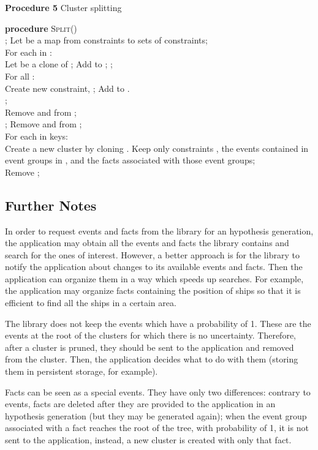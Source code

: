\procedurespace
\begin{snippet}
\textbf{Procedure 5} Cluster splitting\\ \hline

\textbf{procedure} \textsc{Split}()\\
; Let  be a map from constraints to sets of constraints;\\
For each  in :\\
\tab Let  be a clone of ; Add  to ;     ;\\
For all       :\\
\tab Create new constraint, ; Add  to .\\
\tab    ;\\
\tab Remove  and  from ;\\
\tab     ; Remove  and  from ;\\
For each  in  keys:\\
\tab Create a new cluster by cloning . Keep only constraints , the events contained in event groups in , and the facts associated with those event groups;\\
Remove ;\\
\end{snippet}

\subsection{Further Notes}
In order to request events and facts from the library for an hypothesis generation, the application may obtain all the events and facts the library contains and search for the ones of interest. However, a better approach is for the library to notify the application about changes to its available events and facts. Then the application can organize them in a way which speeds up searches. For example, the application may organize facts containing the position of ships so that it is efficient to find all the ships in a certain area.

The library does not keep the events which have a probability of 1. These are the events at the root of the clusters for which there is no uncertainty. Therefore, after a cluster is pruned, they should be sent to the application and removed from the cluster. Then, the application decides what to do with them (storing them in persistent storage, for example).

Facts can be seen as a special events. They have only two differences: contrary to events, facts are deleted after they are provided to the application in an hypothesis generation (but they may be generated again); when the event group associated with a fact reaches the root of the tree, with probability of 1, it is not sent to the application, instead, a new cluster is created with only that fact.

